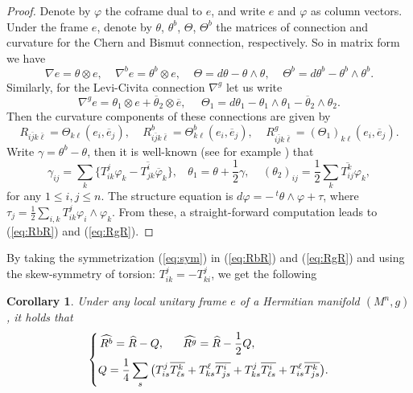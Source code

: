 \documentclass{amsart}
\newtheorem{corollary}[theorem]{Corollary}
\numberwithin{equation}{section}
\begin{document}
\begin{proof}
Denote by $\varphi$ the coframe dual to $e$, and write $e$ and $\varphi$ as column vectors. Under the frame $e$, denote by $\theta$, $\theta^b$, $\Theta$, $\Theta^b$ the matrices of connection and curvature for the Chern and Bismut connection, respectively. So in matrix form we have
$$\nabla e = \theta \otimes  e, \ \ \ \ \ \nabla^b e = \theta^b \otimes  e, \ \ \ \ \ \Theta = d\theta - \theta \wedge \theta,  \ \ \ \ \ \Theta^b = d\theta^b - \theta^b \wedge \theta^b. $$
Similarly, for the Levi-Civita connection $\nabla^g$ let us write
$$ \nabla^g e = \theta_1 \otimes e + \overline{\theta}_2 \otimes \overline{e}, \ \ \ \ \ \  \Theta_1 = d\theta_1 - \theta_1 \wedge \theta_1 - \overline{\theta}_2 \wedge \theta_2. $$
Then the curvature components of these connections are given by
$$ R_{i\bar{j}k\bar{\ell}}= \Theta_{k\ell} (e_i, \overline{e}_j), \ \ \ \ \ R^b_{i\bar{j}k\bar{\ell}}= \Theta^b_{k\ell} (e_i, \overline{e}_j), \ \ \ \ \ R^g_{i\bar{j}k\bar{\ell}}= (\Theta_1)_{k\ell} (e_i, \overline{e}_j). $$
Write $\gamma=\theta^b-\theta $, then it is  well-known (see for example \cite{YangZ}) that
$$ \gamma_{ij} = \sum_k \big\{ T^j_{ik}\varphi_k - \overline{T^i_{jk} } \overline{\varphi}_k \big\}, \ \ \ \ \theta_1 =\theta + \frac12 \gamma, \ \ \ \ \ (\theta_2)_{ij} = \frac12 \sum_k \overline{T^k_{ij}} \varphi_k, $$
for any $1\leq i,j\leq n$. The structure equation is $d\varphi = - \,^t\!\theta \wedge \varphi + \tau$, where $\tau_j = \frac12 \sum_{i,k}T^j_{ik}\varphi_i\wedge \varphi_k$. From these, a straight-forward computation leads to (\ref{eq:RbR}) and (\ref{eq:RgR}).
\end{proof}

By taking the symmetrization (\ref{eq:sym}) in (\ref{eq:RbR}) and (\ref{eq:RgR}) and using the skew-symmetry of torsion: $T^j_{ik}=-T^j_{ki}$, we get the following
\begin{corollary} \label{cor3}
Under any local unitary frame $e$ of a Hermitian manifold $(M^n,g)$, it holds that
\begin{equation}  \label{eq:Q}
\left\{ \begin{split} \widehat{R^b} = \widehat{R} -Q,    \ \ \ \ \ \widehat{R^g} = \widehat{R} -\frac12 Q, \hspace{2.3cm}\\
  Q = \frac14 \sum_s \big( T^{j}_{is} \overline{ T^k_{\ell s }} + T^{\ell }_{ks} \overline{ T^i_{j s }} + T^{j}_{ks} \overline{ T^i_{\ell s }} + T^{\ell}_{is} \overline{ T^k_{j s }} \big).
  \end{split} \right.
\end{equation}
\end{corollary}
\end{document}
